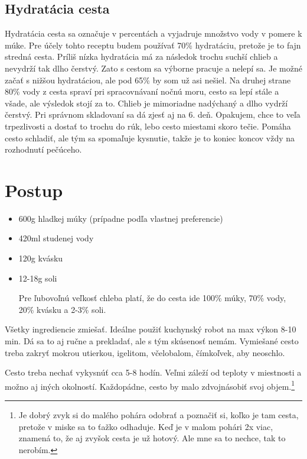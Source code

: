 \documentclass[a4paper,12pt]{article}
\begin{document}
\subsection{Hydratácia cesta}
Hydratácia cesta sa označuje v percentách a vyjadruje množstvo vody v pomere k múke. Pre účely tohto receptu budem používať 70\% hydratáciu, pretože je to fajn stredná cesta. Príliš nízka hydratácia má za následok trochu suchší chlieb a nevydrží tak dlho čerstvý. Zato s cestom sa výborne pracuje a nelepí sa. Je možné začať s nižšou hydratáciou, ale pod 65\% by som už asi nešiel. Na druhej strane 80\% vody z cesta spraví pri spracovnávaní nočnú moru, cesto sa lepí stále a všade, ale výsledok stojí za to. Chlieb je mimoriadne nadýchaný a dlho vydrží čerstvý. Pri správnom skladovaní sa dá zjesť aj na 6. deň. Opakujem, chce to veľa trpezlivosti a dostať to trochu do rúk, lebo cesto miestami skoro tečie. Pomáha cesto schladiť, ale tým sa spomaľuje kysnutie, takže je to koniec koncov vždy na rozhodnutí pečúceho.

\section{Postup}
\begin{tcolorbox}[colframe=blue!50!black, colback=blue!5!white, title=Ingrediencie]
    \begin{itemize}
        \item 600g hladkej múky (prípadne podľa vlastnej preferencie)
        \item 420ml studenej vody
        \item 120g kvásku
        \item 12-18g soli

        Pre ľubovoľnú veľkosť chleba platí, že do cesta ide 100\% múky, 70\% vody, 20\% kvásku a  2-3\% soli.
    \end{itemize}
\end{tcolorbox}

Všetky ingrediencie zmiešať. Ideálne použiť kuchynský robot na max výkon 8-10 min. Dá sa to aj ručne a prekladať, ale s tým skúsenosť nemám. Vymiešané cesto treba zakryť mokrou utierkou, igelitom, včelobalom, čímkoľvek, aby neoschlo.

Cesto treba nechať vykysnúť cca 5-8 hodín. Veľmi záleží od teploty v miestnosti a možno aj iných okolností. Každopádne, cesto by malo zdvojnásobiť svoj objem.\footnote{Je dobrý zvyk si do malého pohára odobrať a poznačiť si, koľko je tam cesta, pretože v miske sa to ťažko odhaduje. Keď je v malom pohári 2x viac, znamená to, že aj zvyšok cesta je už hotový. Ale mne sa to nechce, tak to nerobím.}
\end{document}
